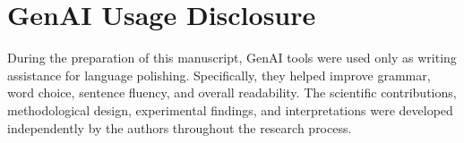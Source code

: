 \documentclass[sigconf]{acmart}
\theoremstyle{plain}
\theoremstyle{definition}
\theoremstyle{remark}
\begin{document}





\maketitle





% 











\clearpage

\appendix


\clearpage
\section*{GenAI Usage Disclosure}
During the preparation of this manuscript, GenAI tools were used only as writing assistance for language polishing. Specifically, they helped improve grammar, word choice, sentence fluency, and overall readability. The scientific contributions, methodological design, experimental findings, and interpretations were developed independently by the authors throughout the research process.






\end{document}
